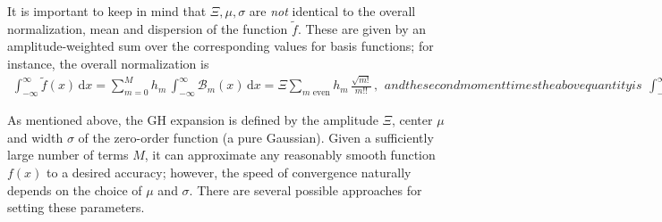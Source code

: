 \documentclass[12pt]{article}
\renewcommand{\d}{\mathrm{d}}
\begin{document}
It is important to keep in mind that $\Xi, \mu, \sigma$ are \textit{not} identical to the overall normalization, mean and dispersion of the function $\tilde f$. These are given by an amplitude-weighted sum over the corresponding values for  basis functions; for instance, the overall normalization is
\begin{subequations}
\begin{align}  \label{eq:GHnormalization}
\int_{-\infty}^{\infty} \tilde f(x)\, \d x =
\sum_{m=0}^M  h_m\, \int_{-\infty}^{\infty} \mathcal B_m(x)\, \d x =
\Xi\!\!\sum_{\mbox{$m$ even}}\!  h_m\, \frac{\sqrt{m!}}{m!!} \,,
\end{align}
and the second moment times the above quantity is
\begin{align}  \label{eq:GHdispersion}
\int_{-\infty}^{\infty} \tilde f(x)\, x^2\, \d x =
\Xi\!\!\sum_{\mbox{$m$ even}}\!  h_m\, \frac{(2m+1)\,\sqrt{m!}}{m!!} \,.
\end{align}
\end{subequations}

As mentioned above, the GH expansion is defined by the amplitude $\Xi$, center $\mu$ and width $\sigma$ of the zero-order function (a pure Gaussian). Given a sufficiently large number of terms $M$, it can approximate any reasonably smooth function $f(x)$ to a desired accuracy; however, the speed of convergence naturally depends on the choice of $\mu$ and $\sigma$. There are several possible approaches for setting these parameters.
\end{document}
